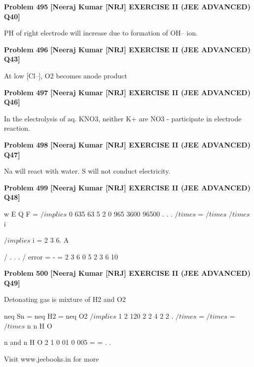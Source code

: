 \begin{problembox}
\textbf{Problem 495} \hfill \textbf{[Neeraj Kumar [NRJ] EXERCISE II (JEE ADVANCED) Q40]}
\label{q:ext-nrj_all_questions-495}

PH of right electrode will increase due to formation 
of OH-- ion.
\end{problembox}

\begin{problembox}
\textbf{Problem 496} \hfill \textbf{[Neeraj Kumar [NRJ] EXERCISE II (JEE ADVANCED) Q43]}
\label{q:ext-nrj_all_questions-496}

At low [Cl--], O2 becomes anode product
\end{problembox}

\begin{problembox}
\textbf{Problem 497} \hfill \textbf{[Neeraj Kumar [NRJ] EXERCISE II (JEE ADVANCED) Q46]}
\label{q:ext-nrj_all_questions-497}

In the electrolysis of aq. KNO3, neither K+ are 
NO3
- participate in electrode reaction.
\end{problembox}

\begin{problembox}
\textbf{Problem 498} \hfill \textbf{[Neeraj Kumar [NRJ] EXERCISE II (JEE ADVANCED) Q47]}
\label{q:ext-nrj_all_questions-498}

Na will react with water. S will not conduct 
electricity.
\end{problembox}

\begin{problembox}
\textbf{Problem 499} \hfill \textbf{[Neeraj Kumar [NRJ] EXERCISE II (JEE ADVANCED) Q48]}
\label{q:ext-nrj_all_questions-499}

w
E
Q
F
=
 $/implies$ 0 635
63 5
2
0 965 3600
96500
.
.
.
$/times$
= $/times$
$/times$
i
 
 
 $/implies$ i = 2
3 6. A
 
   /%
.
.
.
/%
error =
-
=
2
3 6
0 5
2
3 6
10
\end{problembox}

\begin{problembox}
\textbf{Problem 500} \hfill \textbf{[Neeraj Kumar [NRJ] EXERCISE II (JEE ADVANCED) Q49]}
\label{q:ext-nrj_all_questions-500}

Detonating gas is mixture of H2 and O2
 
 neq Sn = neq H2 = neq O2 $/implies$ 1 2
120
2
2
4
2
2
.
$/times$
=
$/times$
=
$/times$
n
n
H
O
 
 
   n
and n
H
O
2
1
0 01
0 005
=
=
.
.
 
 
Visit www.jeebooks.in for more
\end{problembox}

